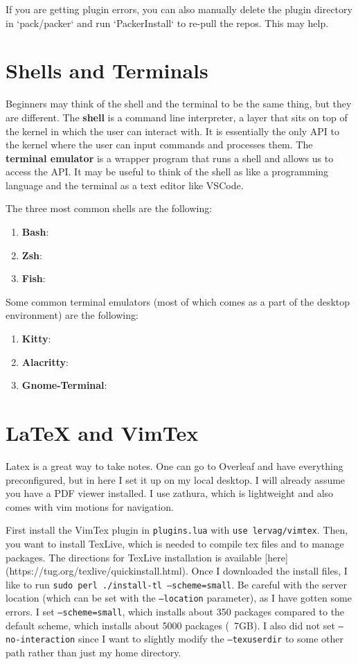 \documentclass{article}
\theoremstyle{definition}
\begin{document}
    If you are getting plugin errors, you can also manually delete the plugin directory in `pack/packer` and run `PackerInstall` to re-pull the repos. This may help. 

\section{Shells and Terminals}

  Beginners may think of the shell and the terminal to be the same thing, but they are different. The \textbf{shell} is a command line interpreter, a layer that sits on top of the kernel in which the user can interact with. It is essentially the only API to the kernel where the user can input commands and processes them. The \textbf{terminal emulator} is a wrapper program that runs a shell and allows us to access the API. It may be useful to think of the shell as like a programming language and the terminal as a text editor like VSCode. 

  The three most common shells are the following: 
  \begin{enumerate}
    \item \textbf{Bash}: 
    \item \textbf{Zsh}: 
    \item \textbf{Fish}:  
  \end{enumerate}

  Some common terminal emulators (most of which comes as a part of the desktop environment) are the following: 
  \begin{enumerate}
    \item \textbf{Kitty}: 
    \item \textbf{Alacritty}: 
    \item \textbf{Gnome-Terminal}: 
  \end{enumerate}

\section{LaTeX and VimTex} 

  Latex is a great way to take notes. One can go to Overleaf and have everything preconfigured, but in here I set it up on my local desktop. I will already assume you have a PDF viewer installed. I use zathura, which is lightweight and also comes with vim motions for navigation. 

  First install the VimTex plugin in \texttt{plugins.lua} with \texttt{use lervag/vimtex}. Then, you want to install TexLive, which is needed to compile tex files and to manage packages. The directions for TexLive installation is available [here](https://tug.org/texlive/quickinstall.html). Once I downloaded the install files, I like to run \texttt{sudo perl ./install-tl --scheme=small}. Be careful with the server location (which can be set with the \texttt{--location} parameter), as I have gotten some errors. I set \texttt{--scheme=small}, which installs about 350 packages compared to the default scheme, which installs about 5000 packages (~7GB). I also did not set \texttt{--no-interaction} since I want to slightly modify the \texttt{--texuserdir} to some other path rather than just my home directory. 
\end{document}

